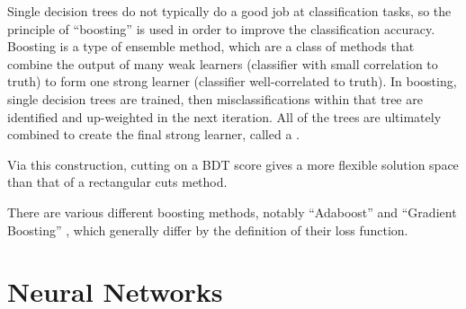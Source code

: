 Single decision trees do not typically do a good job at classification tasks, so the principle of ``boosting'' is used in order to improve the classification accuracy. Boosting is a type of ensemble method, which are a class of methods that combine the output of many weak learners (classifier with small correlation to truth) to form one strong learner (classifier well-correlated to truth). In boosting, single decision trees are trained, then misclassifications within that tree are identified and up-weighted in the next iteration. All of the trees are ultimately combined to create the final strong learner, called a . 

Via this construction, cutting on a \gls{BDT} score gives a more flexible solution space than that of a rectangular cuts method.

There are various different boosting methods, notably ``Adaboost'' \cite{adaboost} and ``Gradient Boosting'' \cite{gradBoost}, which generally differ by the definition of their loss function.

\section{Neural Networks}

